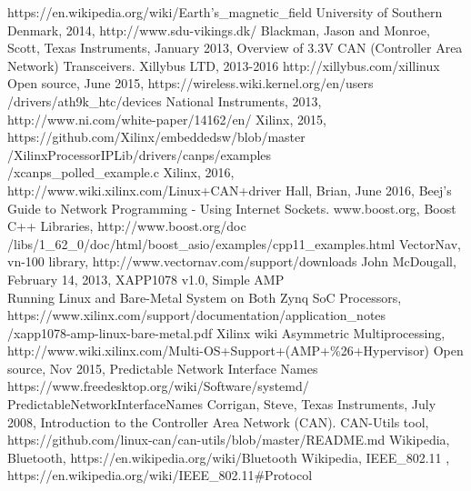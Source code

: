 \begin{thebibliography}{21} %
		https://en.wikipedia.org/wiki/Earth's\_magnetic\_field
		University of Southern Denmark, 2014, http://www.sdu-vikings.dk/
		Blackman, Jason and Monroe, Scott, Texas Instruments, January 2013, Overview of 3.3V CAN (Controller Area Network) Transceivers.
		Xillybus LTD, 2013-2016 http://xillybus.com/xillinux
		Open source, June 2015, https://wireless.wiki.kernel.org/en/users\\
		/drivers/ath9k\_htc/devices
		National Instruments, 2013, http://www.ni.com/white-paper/14162/en/
		Xilinx, 2015, https://github.com/Xilinx/embeddedsw/blob/master\\
		/XilinxProcessorIPLib/drivers/canps/examples\\
		/xcanps\_polled\_example.c
		Xilinx, 2016, http://www.wiki.xilinx.com/Linux+CAN+driver
		Hall, Brian, June 2016, Beej's Guide to Network Programming - Using Internet Sockets.
		www.boost.org, Boost C++ Libraries, http://www.boost.org/doc \\
		/libs/1\_62\_0/doc/html/boost\_asio/examples/cpp11\_examples.html
		VectorNav, vn-100 library, http://www.vectornav.com/support/downloads
		John McDougall, February 14, 2013, XAPP1078 v1.0, Simple AMP\\
		Running Linux and Bare-Metal System on Both Zynq SoC Processors,\\
		https://www.xilinx.com/support/documentation/application\_notes\\
		/xapp1078-amp-linux-bare-metal.pdf
		Xilinx wiki Asymmetric Multiprocessing,\\
		http://www.wiki.xilinx.com/Multi-OS+Support+(AMP+\%26+Hypervisor)
		Open source, Nov 2015, Predictable Network Interface Names \\
		https://www.freedesktop.org/wiki/Software/systemd/\\
		PredictableNetworkInterfaceNames
			Corrigan, Steve, Texas Instruments, July 2008, Introduction to the Controller Area Network (CAN).
			CAN-Utils tool, https://github.com/linux-can/can-utils/blob/master/README.md
			Wikipedia, Bluetooth, https://en.wikipedia.org/wiki/Bluetooth
			Wikipedia, IEEE\_802.11 , https://en.wikipedia.org/wiki/IEEE\_802.11\#Protocol
\end{thebibliography}
